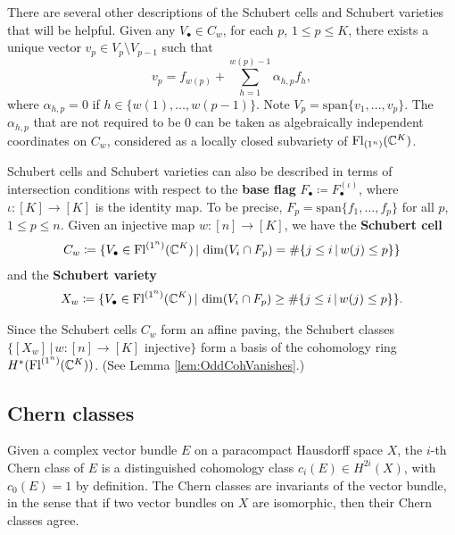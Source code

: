 \documentclass[11pt]{amsart}
\theoremstyle{definition}
\newcommand{\st}{\,|\,}
\newcommand{\vspan}{\mathrm{span}}
\newcommand{\Fl}{\mathrm{Fl}}
\begin{document}
There are several other descriptions of the Schubert cells and Schubert varieties that will be helpful.  Given any $V_\bullet\in C_w$, for each $p$, $1\leq p\leq K$, there exists a unique vector $v_p\in V_p\setminus V_{p-1}$ such that
\begin{equation} \label{eq:SchubCellCoords}
v_p=f_{w(p)}+\sum_{h=1}^{w(p)-1} \alpha_{h,p} f_h,
\end{equation}
where $\alpha_{h,p}=0$ if $h\in\{w(1),\ldots,w(p-1)\}$.  Note $V_p=\vspan\{v_1,\ldots,v_p\}$.  The $\alpha_{h,p}$ that are not required to be 0 can be taken as algebraically independent coordinates on $C_w$, considered as a locally closed subvariety of $\Fl_{(1^n)}(\bC^K)$.

Schubert cells and Schubert varieties can also be described in terms of intersection conditions with respect to the {\bf base flag} $F_\bullet \coloneqq F_\bullet^{(\iota)}$, where $\iota : [K]\to[K]$ is the identity map. To be precise, $F_p=\vspan\{f_1,\ldots,f_p\}$ for all $p$, $1\leq p\leq n$.  Given an injective map $w : [n]\to [K]$, we have the \textbf{Schubert cell}
\begin{align} \label{eqn:SchubCellDef}
 C_w \coloneqq \{V_\bullet \in \Fl^{(1^n)}(\bC^K) \st \dim(V_i\cap F_p) = \#\{j\leq i \st w(j)\leq p\}\}
\end{align}
and the \textbf{Schubert variety}
\begin{align}
    X_w \coloneqq \{V_\bullet \in \Fl^{(1^n)}(\bC^K) \st \dim(V_i\cap F_p) \geq \#\{j\leq i\st w(j)\leq p\}\}.
\end{align}

Since the Schubert cells $C_w$ form an affine paving, the Schubert classes $\{[X_w] \st w:[n]\to [K] \text{ injective}\}$ form a basis of the cohomology ring $H^*(\Fl^{(1^n)}(\bC^K))$. (See Lemma \ref{lem:OddCohVanishes}.)



\subsection{Chern classes} 

Given a complex vector bundle $E$ on a paracompact Hausdorff space $X$, the $i$-th Chern class of $E$ is a distinguished cohomology class $c_i(E)\in H^{2i}(X)$, with $c_0(E) = 1$ by definition. The Chern classes are invariants of the vector bundle, in the sense that if two vector bundles on $X$ are isomorphic, then their Chern classes agree.  
\end{document}

